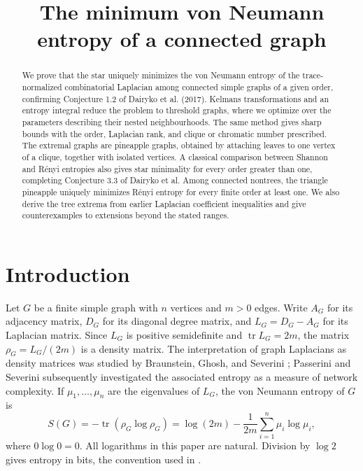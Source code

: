 \documentclass[11pt,a4paper,reqno]{amsart}
\title[Minimum von Neumann entropy]{The minimum von Neumann entropy of a connected graph}
\date{}
\theoremstyle{remark}
\newcommand{\tr}{\operatorname{tr}}
\newcommand{\Ent}{S}
\numberwithin{equation}{section}
\begin{document}
\begin{abstract}
We prove that the star uniquely minimizes the von Neumann entropy
of the trace-normalized combinatorial Laplacian among connected
simple graphs of a given order, confirming Conjecture 1.2 of
Dairyko et al. (2017). Kelmans transformations and an entropy integral
reduce the problem to threshold graphs, where we optimize over the
parameters describing their nested neighbourhoods.
The same method gives sharp bounds with the order, Laplacian rank,
and clique or chromatic number prescribed. The extremal graphs are
pineapple graphs, obtained by attaching leaves to one vertex of a
clique, together with isolated vertices.
A classical comparison between Shannon and R\'enyi entropies also gives
star minimality for every order greater than one, completing
Conjecture 3.3 of Dairyko et al. Among connected nontrees, the triangle pineapple
uniquely minimizes R\'enyi entropy for every finite order at least one. We also derive
the tree extrema from earlier Laplacian coefficient inequalities and
give counterexamples to extensions beyond the stated ranges.
\end{abstract}
\maketitle

\section{Introduction}\label{sec:introduction}

Let $G$ be a finite simple graph with $n$ vertices and $m>0$ edges.
Write $A_G$ for its adjacency matrix, $D_G$ for its diagonal degree
matrix, and $L_G=D_G-A_G$ for its Laplacian matrix. Since $L_G$ is
positive semidefinite and $\tr L_G=2m$, the matrix $\rho_G=L_G/(2m)$
is a density matrix. The interpretation of graph Laplacians as density
matrices was studied by Braunstein, Ghosh, and Severini
\cite{Braunstein2006}; Passerini and Severini \cite{Passerini2009}
subsequently investigated the associated entropy as a measure of
network complexity. If $\mu_1,\ldots,\mu_n$ are the eigenvalues of
$L_G$, the von Neumann entropy of $G$ is
\begin{equation}\label{eq:entropy}
 \Ent(G)=-\tr(\rho_G\log\rho_G)
 =\log(2m)-\frac1{2m}\sum_{i=1}^n\mu_i\log\mu_i,
\end{equation}
where $0\log0=0$. All logarithms in this paper are natural. Division
by $\log2$ gives entropy in bits, the convention used in
\cite{Dairyko2017}.
\end{document}
